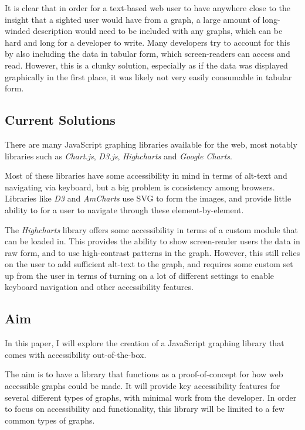\documentclass[ %
                    author={Aleena Baig},
                supervisor={Dr Simon Lock},
                    degree={BSc},
                     title={On Making Web Accessible Graphs},
                  subtitle={},
                      year={2019} ]{dissertation}
\begin{document}
It is clear that in order for a text-based web user to have anywhere close to the insight that a sighted user would have from a graph, a large amount of long-winded description would need to be included with any graphs, which can be hard and long for a developer to write. Many developers try to account for this by also including the data in tabular form, which screen-readers can access and read. However, this is a clunky solution, especially as if the data was displayed graphically in the first place, it was likely not very easily consumable in tabular form.

\subsection{Current Solutions}

There are many JavaScript graphing libraries available for the web, most notably libraries such as \textit{Chart.js}, \textit{D3.js}, \textit{Highcharts} and \textit{Google Charts}.

Most of these libraries have some accessibility in mind in terms of alt-text and navigating via keyboard, but a big problem is consistency among browsers. Libraries like \textit{D3} and \textit{AmCharts} use SVG to form the images, and provide little ability to for a user to navigate through these element-by-element.

The \textit{Highcharts} library offers some accessibility in terms of a custom module that can be loaded in. This provides the ability to show screen-reader users the data in raw form, and to use high-contrast patterns in the graph. However, this still relies on the user to add sufficient alt-text to the graph, and requires some custom set up from the user in terms of turning on a lot of different settings to enable keyboard navigation and other accessibility features.

\subsection{Aim}

In this paper, I will explore the creation of a JavaScript graphing library that comes with accessibility out-of-the-box.

The aim is to have a library that functions as a proof-of-concept for how web accessible graphs could be made. It will provide key accessibility features for several different types of graphs, with minimal work from the developer. In order to focus on accessibility and functionality, this library will be limited to a few common types of graphs.
\end{document}
